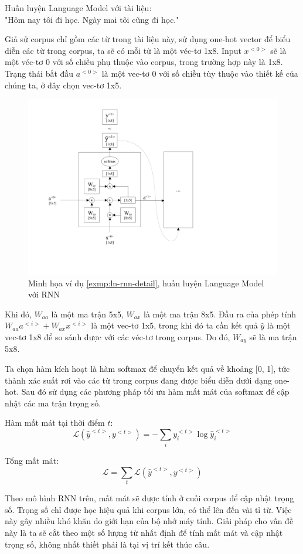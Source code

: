 \begin{exmp}
\label{exmp:ln-rnn-detail}
Huấn luyện Language Model với tài liệu:\\ "Hôm nay tôi đi học. Ngày mai tôi cũng đi học."\par
Giả sử corpus chỉ gồm các từ trong tài liệu này, sử dụng one-hot vector để biểu diễn các từ trong corpus, ta sẽ có mỗi từ là một véc-tơ 1x8. Input $x^{<0>}$ sẽ là một véc-tơ 0 với số chiều phụ thuộc vào corpus, trong trường hợp này là 1x8.
Trạng thái bắt đầu $a^{<0>}$ là một vec-tơ 0 với số chiều tùy thuộc vào thiết kế của chúng ta, ở đây chọn vec-tơ 1x5.\par

\begin{figure}[h!]
    \centering
    \includegraphics[width=13cm]{chapter07/figure-sec12/lm-rnn-detail.pdf}
    \caption{Minh họa ví dụ \ref{exmp:ln-rnn-detail}, huấn luyện Language Model với RNN}
    \label{fig:lm-rnn-detail}
\end{figure}

Khi đó, $W_{aa}$ là một ma trận 5x5, $W_{ax}$ là một ma trận 8x5. Đầu ra của phép tính $W_{aa}a^{<i>} + W_{ax}x^{<i>}$ là một vec-tơ 1x5, trong khi đó ta cần kết quả $\hat{y}$ là một vec-tơ 1x8 để so sánh được với các véc-tơ trong corpus. Do đó, $W_{ay}$ sẽ là ma trận 5x8.\par
Ta chọn hàm kích hoạt là hàm softmax để chuyển kết quả về khoảng [0, 1], tức thành xác suất rơi vào các từ trong corpus đang được biểu diễn dưới dạng one-hot. Sau đó sử dụng các phương pháp tối ưu hàm mất mát của softmax để cập nhật các ma trận trọng số.
\end{exmp}
Hàm mất mát tại thời điểm $t$:
$$
\mathcal{L}(\hat{y}^{<t>}, y^{<t>}) = - \sum\limits_{i}{y_i^{<t>}\log{\hat{y}_i^{<t>}}}
$$\par
Tổng mất mát:
$$
\mathcal{L} = \sum\limits_{t}{\mathcal{L}(\hat{y}^{<t>}, y^{<t>})}
$$

Theo mô hình RNN trên, mất mát sẽ được tính ở cuối corpus để cập nhật trọng số. Trọng số chỉ được học hiệu quả khi corpus lớn, có thể lên đến vài tỉ từ. Việc này gây nhiều khó khăn do giới hạn của bộ nhớ máy tính. Giải pháp cho vấn đề này là ta sẽ cắt theo một số lượng từ nhất định để tính mất mát và cập nhật trọng số, không nhất thiết phải là tại vị trí kết thúc câu.
